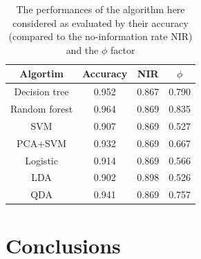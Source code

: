 \documentclass[
12pt, %
a4paper, %
oneside, %
headinclude,footinclude, %
BCOR5mm, %
]{scrartcl}
\begin{document}
\begin{table}[]
\caption{The performances of the algorithm here considered as evaluated by their accuracy (compared to the no-information rate NIR) and the $\phi$ factor} 
\begin{center}
\begin{tabular}{c||c|c|c}
{\color[HTML]{CB0000} \textbf{Algortim}} & {\color[HTML]{CB0000} \textbf{Accuracy}} & {\color[HTML]{CB0000} \textbf{NIR}} & {\color[HTML]{CB0000} \textbf{$\phi$}} \\ \hline\hline
Decision tree                            & 0.952                                    & 0.867                               & 0.790                                  \\ \hline
Random forest                            & 0.964                                    & 0.869                               & 0.835                                  \\ \hline
SVM                                      & 0.907                                    & 0.869                               & 0.527                                  \\ \hline
PCA+SVM                                  & 0.932                                    & 0.869                               & 0.667                                  \\ \hline
Logistic                                 & 0.914                                    & 0.869                               & 0.566                                  \\ \hline
LDA                                      & 0.902                                    & 0.898                               & 0.526                                  \\ \hline
QDA                                      & 0.941                                    & 0.869                               & 0.757 
                              
\end{tabular}
\end{center}
\label{perf_table} 
\end{table}



\clearpage

\section{Conclusions}
\end{document}
